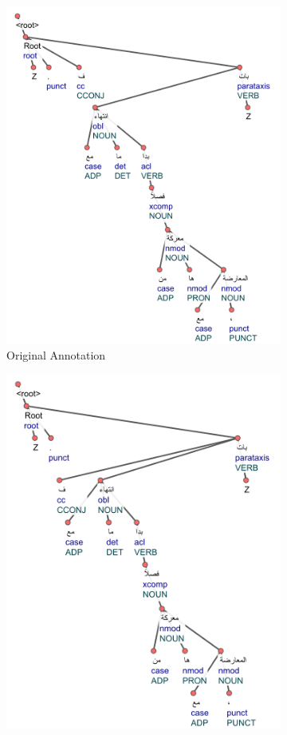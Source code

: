 \begin{figure}[H]
    \begin{subfigure}{\textwidth}
    \centering
    \includegraphics[scale=0.7]{img/siblingAttach-ar-1.png}
    \caption{Original Annotation}
    \label{fig:siblingAttach-ar-1}
    \end{subfigure}
    \newline
    \begin{subfigure}{\textwidth}
    \centering
    \includegraphics[scale=0.7]{img/siblingAttach-ar-2.png}

\end{subfigure}
\end{figure}
